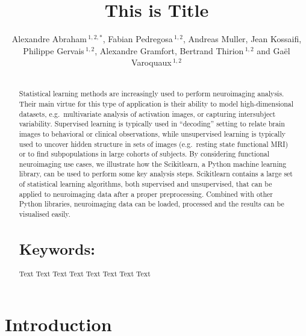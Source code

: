 \documentclass{frontiersSCNS} %
\def\firstAuthorLast{Sample {et~al}} %
\def\Authors{Alexandre Abraham\,$^{1,2,*}$, Fabian Pedregosa\,$^{1,2}$, Andreas Muller, Jean Kossaifi, Philippe Gervais\,$^{1,2}$, Alexandre Gramfort, Bertrand Thirion\,$^{1,2}$ and Gaël Varoquaux\,$^{1,2}$}
\begin{document}
\onecolumn
{}

\title[Running Title]{This is Title}
\author[\firstAuthorLast ]{\Authors}
\address{}
\correspondance{}
\editor{}

\maketitle
\begin{abstract}

\section{}
Statistical  learning  methods  are   increasingly  used  to  perform
neuroimaging  analysis.  Their  main  virtue  for this  type  of  application
is  their  ability  to   model  high-dimensional  datasets,  e.g.\ multivariate
analysis  of activation  images,  or  capturing  inter­subject  variability.
Supervised  learning  is  typically  used  in  “decoding” setting  to  relate
brain   images  to  behavioral  or  clinical  observations,  while
unsupervised  learning  is  typically used  to  uncover  hidden  structure  in
sets  of  images   (e.g.\ resting  state  functional  MRI)  or  to  find
sub­populations  in  large  cohorts  of  subjects.   By  considering
functional  neuroimaging  use  cases,  we illustrate  how  the  Scikit­learn,
a  Python machine  learning  library,  can  be used to perform  some  key
analysis steps.  Scikit­learn  contains  a  large   set  of  statistical
learning  algorithms,  both  supervised  and unsupervised, that can be  applied
to neuroimaging data after a  proper preprocessing.  Combined  with  other
Python  libraries, neuroimaging data can be loaded, processed and the results
can be visualised easily.



\tiny
  \section{Keywords:} Text Text Text Text Text Text Text Text  %
\end{abstract}


\section{Introduction}

\end{document}
